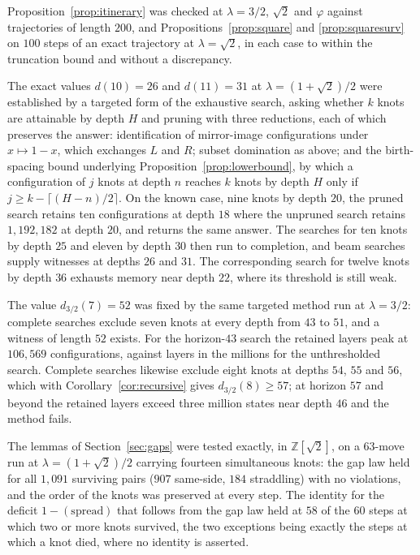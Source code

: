 \documentclass[11pt,reqno]{amsart}
\theoremstyle{plain}
\theoremstyle{definition}
\theoremstyle{remark}
\newcommand{\Z}{\mathbb{Z}}
\begin{document}
Proposition~\ref{prop:itinerary} was checked at $\lambda=3/2$, $\sqrt2$ and
$\varphi$ against trajectories of length $200$, and
Propositions~\ref{prop:square} and \ref{prop:squaresurv} on $100$ steps of an
exact trajectory at $\lambda=\sqrt2$, in each case to within the truncation
bound and without a discrepancy.

The exact values $d(10)=26$ and $d(11)=31$ at $\lambda=(1+\sqrt2)/2$ were
established by a targeted form of the exhaustive search, asking whether $k$
knots are attainable by depth $H$ and pruning with three reductions, each of
which preserves the answer: identification of mirror-image configurations under
$x\mapsto1-x$, which exchanges $L$ and $R$; subset domination as above; and the
birth-spacing bound underlying Proposition~\ref{prop:lowerbound}, by which a
configuration of $j$ knots at depth $n$ reaches $k$ knots by depth $H$ only if
$j\geq k-\lceil(H-n)/2\rceil$. On the known case, nine knots by depth $20$, the
pruned search retains ten configurations at depth $18$ where the unpruned
search retains $1{,}192{,}182$ at depth $20$, and returns the same answer. The
searches for ten knots by depth $25$ and eleven by depth $30$ then run to
completion, and beam searches supply witnesses at depths $26$ and $31$. The
corresponding search for twelve knots by depth $36$ exhausts memory near depth
$22$, where its threshold is still weak.

The value $d_{3/2}(7)=52$ was fixed by the same targeted method run at
$\lambda=3/2$: complete searches exclude seven knots at every depth from $43$
to $51$, and a witness of length $52$ exists. For the horizon-$43$ search the
retained layers peak at $106{,}569$ configurations, against layers in the
millions for the unthresholded search. Complete searches likewise exclude
eight knots at depths $54$, $55$ and $56$, which with
Corollary~\ref{cor:recursive} gives $d_{3/2}(8)\geq57$; at horizon $57$ and
beyond the retained layers exceed three million states near depth $46$ and the
method fails.


The lemmas of Section~\ref{sec:gaps} were tested exactly, in
$\Z[\sqrt2]$, on a $63$-move run at $\lambda=(1+\sqrt2)/2$ carrying fourteen
simultaneous knots: the gap law held for all $1{,}091$ surviving pairs
($907$ same-side, $184$ straddling) with no violations, and the order of the
knots was preserved at every step. The identity for the deficit
$1-(\mathrm{spread})$ that follows from the gap law held at $58$ of the $60$
steps at which two or more knots survived, the two exceptions being exactly
the steps at which a knot died, where no identity is asserted.
\end{document}
